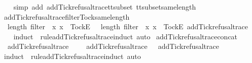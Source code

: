\begin{isabellebody}
%
\isadelimproof
\ \ %
\endisadelimproof
%
\isatagproof
{}\isamarkupfalse%
\ {\isacharparenleft}simp\ add{\isacharcolon}\ add{\isacharunderscore}Tick{\isacharunderscore}refusal{\isacharunderscore}trace{\isacharunderscore}tt{\isacharunderscore}subset\ tt{\isacharunderscore}subset{\isacharunderscore}same{\isacharunderscore}length{\isacharparenright}%
\endisatagproof
{\isafoldproof}%
%
\isadelimproof
\isanewline
%
\endisadelimproof
\isanewline
{}\isamarkupfalse%
\ add{\isacharunderscore}Tick{\isacharunderscore}refusal{\isacharunderscore}trace{\isacharunderscore}filter{\isacharunderscore}Tock{\isacharunderscore}same{\isacharunderscore}length{\isacharcolon}\isanewline
\ \ {\isachardoublequoteopen}length\ {\isacharparenleft}filter\ {\isacharparenleft}{\isasymlambda}\ x{\isachardot}\ x\ {\isacharequal}\ {\isacharbrackleft}Tock{\isacharbrackright}\isactrlsub E{\isacharparenright}\ {\isasymrho}{\isacharparenright}\ {\isacharequal}\ length\ {\isacharparenleft}filter\ {\isacharparenleft}{\isasymlambda}\ x{\isachardot}\ x\ {\isacharequal}\ {\isacharbrackleft}Tock{\isacharbrackright}\isactrlsub E{\isacharparenright}\ {\isacharparenleft}add{\isacharunderscore}Tick{\isacharunderscore}refusal{\isacharunderscore}trace\ {\isasymrho}{\isacharparenright}{\isacharparenright}{\isachardoublequoteclose}\isanewline
%
\isadelimproof
\ \ %
\endisadelimproof
%
\isatagproof
{}\isamarkupfalse%
\ {\isacharparenleft}induct\ {\isasymrho}\ rule{\isacharcolon}add{\isacharunderscore}Tick{\isacharunderscore}refusal{\isacharunderscore}trace{\isachardot}induct{\isacharcomma}\ auto{\isacharparenright}%
\endisatagproof
{\isafoldproof}%
%
\isadelimproof
\isanewline
%
\endisadelimproof
\isanewline
{}\isamarkupfalse%
\ add{\isacharunderscore}Tick{\isacharunderscore}refusal{\isacharunderscore}trace{\isacharunderscore}concat{\isacharcolon}\isanewline
\ \ {\isachardoublequoteopen}add{\isacharunderscore}Tick{\isacharunderscore}refusal{\isacharunderscore}trace\ {\isacharparenleft}{\isasymrho}\ {\isacharat}\ {\isasymsigma}{\isacharparenright}\ {\isacharequal}\ add{\isacharunderscore}Tick{\isacharunderscore}refusal{\isacharunderscore}trace\ {\isasymrho}\ {\isacharat}\ add{\isacharunderscore}Tick{\isacharunderscore}refusal{\isacharunderscore}trace\ {\isasymsigma}{\isachardoublequoteclose}\isanewline
%
\isadelimproof
\ \ %
\endisadelimproof
%
\isatagproof
{}\isamarkupfalse%
\ {\isacharparenleft}induct\ {\isasymrho}\ rule{\isacharcolon}add{\isacharunderscore}Tick{\isacharunderscore}refusal{\isacharunderscore}trace{\isachardot}induct{\isacharcomma}\ auto{\isacharparenright}%

\end{isabellebody}
